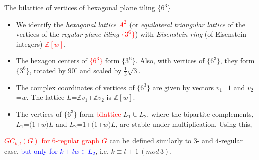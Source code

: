 \documentclass{beamer}
\begin{document}
\begin{frame}{The bilattice of vertices of hexagonal plane tiling 
$\{6^3\}$}
\vspace{-2.5mm}  
\begin{itemize}
\item We  identify the {\em hexagonal lattice}  \textcolor{red}{$A^2$} (or 
{\em equilateral triangular lattice} of the 
vertices of 
the {\em regular plane tiling}  \textcolor{red}{$\{3^6\}$})
with {\em Eisenstein ring} (of Eisenstein integers)  
\textcolor{red}{$\mathbb{Z}[w]$}.
\item The hexagon centers of
\textcolor{red}{$\{6^3\}$}
form  $\{3^6\}$. Also,
with vertices of $\{6^3\}$, they form $\{3^6\}$, rotated by
 $90^{\circ}$ and scaled by $\frac{1}{3}\sqrt{3}$.



\item The complex coordinates of vertices of $\{6^3\}$ are given by vectors $v_1$=$1$
and $v_2$=$w$.
The
lattice $L$=$\mathbb{Z}v_1$+$\mathbb{Z}v_2$ is
$\mathbb{Z}[w]$.
\item
The vertices of $\{6^3\}$ form \textcolor{red}{bilattice} $L_1\cup L_2$, 
where
the bipartite complements, $L_1$=$(1$+$w)L$ and
$L_2$=$1$+$(1$+$w)L$, are stable under multiplication. Using this,
\end{itemize}

\textcolor{red}{$GC_{k,l}(G)$ for $6$-regular graph $G$}
can be  defined similarly to $3$- and $4$-regular case, \textcolor{blue}{but only for $k+lw\in L_2$}, i.e. 
$k\equiv l\pm 
1\,(mod\,3)$.

\end{frame}
\end{document}
